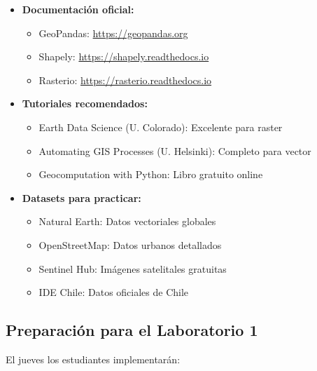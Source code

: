 \documentclass[11pt,a4paper]{article}
\begin{document}
\begin{itemize}
    \item \textbf{Documentación oficial:}
    \begin{itemize}
        \item GeoPandas: \url{https://geopandas.org}
        \item Shapely: \url{https://shapely.readthedocs.io}
        \item Rasterio: \url{https://rasterio.readthedocs.io}
    \end{itemize}
    
    \item \textbf{Tutoriales recomendados:}
    \begin{itemize}
        \item Earth Data Science (U. Colorado): Excelente para raster
        \item Automating GIS Processes (U. Helsinki): Completo para vector
        \item Geocomputation with Python: Libro gratuito online
    \end{itemize}
    
    \item \textbf{Datasets para practicar:}
    \begin{itemize}
        \item Natural Earth: Datos vectoriales globales
        \item OpenStreetMap: Datos urbanos detallados
        \item Sentinel Hub: Imágenes satelitales gratuitas
        \item IDE Chile: Datos oficiales de Chile
    \end{itemize}
\end{itemize}

\subsection{Preparación para el Laboratorio 1}

El jueves los estudiantes implementarán:
\end{document}

